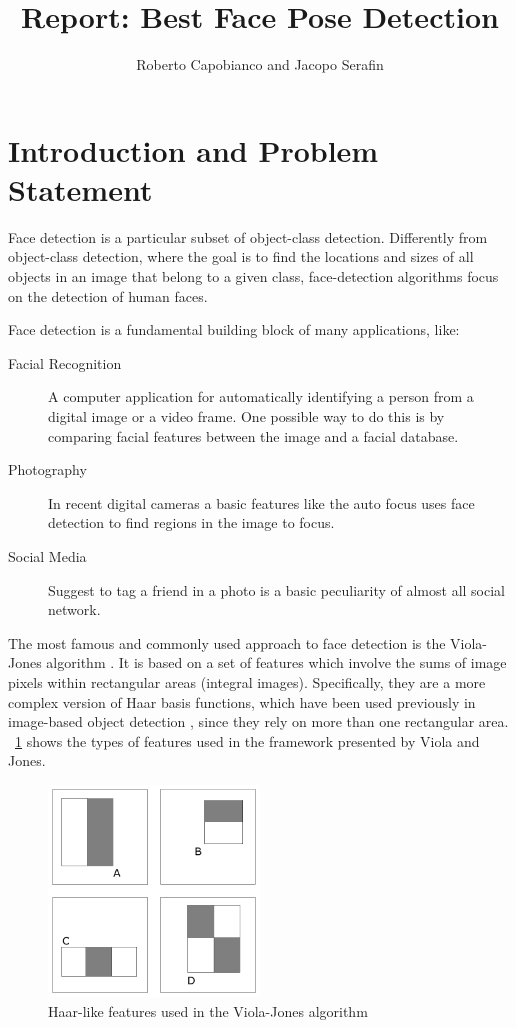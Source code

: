 \documentclass[10pt,a4paper]{report}
\author{Roberto Capobianco and Jacopo Serafin}
\title{Report: Best Face Pose Detection}
\begin{document}
\maketitle
\section*{Introduction and Problem Statement}
Face detection is a particular subset of object-class detection. Differently from object-class detection, where the goal is to find the locations and sizes of all objects in an image that belong to a given class, face-detection algorithms focus on the detection of human faces.

Face detection is a fundamental building block of many applications, like:
\begin{description}
  \item[Facial Recognition] A computer application for automatically identifying a person from a digital image or a video frame. One possible way to do this is by comparing facial features between the image and a facial database.
  \item[Photography] In recent digital cameras a basic features like the auto focus uses face detection to find regions in the image to focus.
  \item[Social Media] Suggest to tag a friend in a photo is a basic peculiarity of almost all social network.
\end{description}
The most famous and commonly used approach to face detection is the Viola-Jones algorithm \cite{viola2004robust}. It is based on a set of features which involve the sums of image pixels within rectangular areas (integral images). Specifically, they are a more complex version of Haar basis functions, which have been used previously in image-based object detection \cite{papageorgiou}, since they rely on more than one rectangular area. \figurename~\ref{fig:haar_features} shows the types of features used in the framework presented by Viola and Jones. 
\begin{figure}
\centering
\includegraphics[width=0.5\textwidth]{./haar_features.png}
\caption{Haar-like features used in the Viola-Jones algorithm}
\label{fig:haar_features}
\end{figure}
\end{document}
